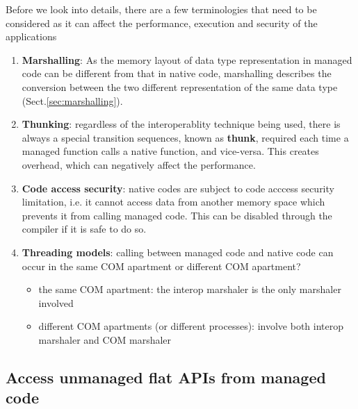 

Before we look into details, there are a few terminologies that need to be
considered as it can affect the performance, execution and security of the
applications
\begin{enumerate}
  \item {\bf Marshalling}: As the memory layout of data type representation in
  managed code can be different from that in native code, marshalling describes the conversion
  between the two different representation of the same data type (Sect.\ref{sec:marshalling}).
  
  \item {\bf Thunking}: regardless of the interoperablity technique being used, there
  is always a special transition sequences, known as {\bf thunk}, required each
  time a managed function calls a native function, and vice-versa. This creates
  overhead, which can negatively affect the performance.
  
  
  \item {\bf Code access security}: native codes are subject to code acccess security
  limitation, i.e. it cannot access data from another memory space which
  prevents it from calling managed code. This can be disabled through the
  compiler if it is safe to do so.
  
  \item {\bf Threading models}: calling between managed code and native code can occur
  in the same COM apartment or different COM apartment?
  \begin{itemize}
    \item the same COM apartment: the interop marshaler is the only marshaler
    involved
    
    \item different COM apartments (or different processes): involve both
    interop marshaler and COM marshaler
  \end{itemize}
\end{enumerate}



\subsection{Access unmanaged flat APIs from managed code}

